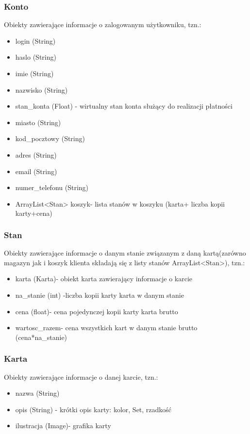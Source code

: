 \documentclass[11pt]{article}   %
\begin{document}
\subsubsection{Konto}
Obiekty zawierające informacje o zalogowanym użytkowniku, tzn.:
\begin{itemize}
	\item login (String)
	\item haslo (String)
	\item imie (String)
	\item nazwisko (String)
	\item stan\_konta (Float) - wirtualny stan konta służący do realizacji płatności
	\item miasto (String)
	\item kod\_pocztowy (String)
	\item adres (String)
	\item email (String)
	\item numer\_telefonu (String)
	\item ArrayList<Stan> koszyk- lista stanów w koszyku (karta+ liczba kopii karty+cena)
	
\end{itemize}
\subsubsection{Stan}
Obiekty zawierające informacje o danym stanie związanym z daną kartą(zarówno magazyn jak i koszyk klienta składają się z listy stanów ArrayList<Stan>), tzn.:
\begin{itemize}
	\item karta (Karta)- obiekt karta zawierający informacje o karcie
	\item na\_stanie (int) -liczba kopii karty karta w danym stanie
	\item cena (float)- cena pojedynczej kopii karty karta brutto
	\item wartosc\_razem- cena wszystkich kart w danym stanie brutto (cena*na\_stanie)
	
\end{itemize}
\subsubsection{Karta}
Obiekty zawierające informacje o danej karcie, tzn.:
\begin{itemize}
	\item nazwa (String)
	\item opis (String) - krótki opis karty: kolor, Set, rzadkość
	\item ilustracja (Image)- grafika karty

	
\end{itemize}
\end{document}
